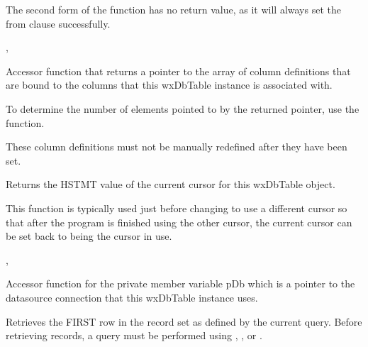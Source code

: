The second form of the function has no return value, as it will always set
the from clause successfully.


,


\label{wxdbtablegetcoldefs}


Accessor function that returns a pointer to the array of column definitions
that are bound to the columns that this wxDbTable instance is associated
with.

To determine the number of elements pointed to by the returned
 pointer, use the
 function.


These column definitions must not be manually redefined after they have been
set.

\label{wxdbtablegetcursor}


Returns the HSTMT value of the current cursor for this wxDbTable object.


This function is typically used just before changing to use a different cursor
so that after the program is finished using the other cursor, the current
cursor can be set back to being the cursor in use.


, 

\label{wxdbtablegetdb}


Accessor function for the private member variable pDb which is a pointer to
the datasource connection that this wxDbTable instance uses.

\label{wxdbtablegetfirst}


Retrieves the FIRST row in the record set as defined by the current query.
Before retrieving records, a query must be performed using
,
,
 or
.

